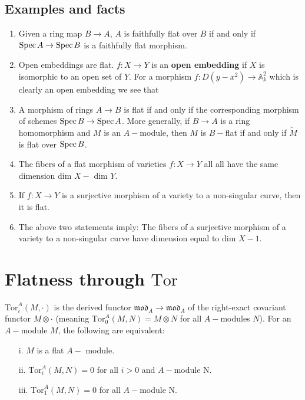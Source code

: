 \documentclass[12pt]{article}
\theoremstyle{mytheoremstyle}
\newcommand{\bA}{\mathbb{A}}
\newcommand{\spec}{\text{Spec\hspace*{.5mm}}}
\newcommand{\tor}{\text{Tor}}
\begin{document}
\subsection*{Examples and facts}
\begin{enumerate}
    \item Given a ring map $B\to A$, $A$ is faithfully flat over $B$
        if and only if $\spec A\to\spec B$ is a faithfully flat morphism.
    \item Open embeddings are flat. $f:X\to Y$ is an \textbf{open
        embedding} if $X$ is isomorphic to an open set of $Y$. For a
        morphism $f:D(y-x^2)\to \bA^2_k$ which is clearly an open
        embedding we see that 
    \item A morphism of rings $A\to B$ is flat if and only if the
        corresponding morphism of schemes $\spec B\to\spec A$.
        More generally, if $B\to A$ is a ring homomorphism and $M$ is
        an $A-$module, then $M$ is $B-$flat if and only if
        $\widetilde{M}$ is flat over $\spec B$.
    \item The fibers of a flat morphism of varieties $f:X\to Y$ all
        all have the same dimension dim $X-$ dim $Y$. 
    \item If $f:X\to Y$ is a surjective morphism of a variety to
        a non-singular curve, then it is flat.
    \item The above two statements imply: The fibers of a surjective
        morphism of a variety to a non-singular curve have dimension
        equal to dim $X-1$.
\end{enumerate}

\section{Flatness through $\tor$}
\hspace*{8mm}$\tor^A_i(M,\cdot)$ is the derived functor
$\mathfrak{mod}_A\to\mathfrak{mod}_A$
of the right-exact covariant functor
$M\otimes\cdot$ (meaning $\tor^A_0(M,N)
=M\otimes N$ for all $A-$modules $N$).
For an $A-$module $M$, the following are equivalent:
\begin{enumerate}
    \item[i.] $M$ is a flat $A-$ module.
    \item[ii.] $\tor^A_i(M,N)=0$ for all $i>0$ and $A-$module N.
    \item[iii.] $\tor^A_1(M,N)=0$ for all $A-$module N.
\end{enumerate}
\end{document}
